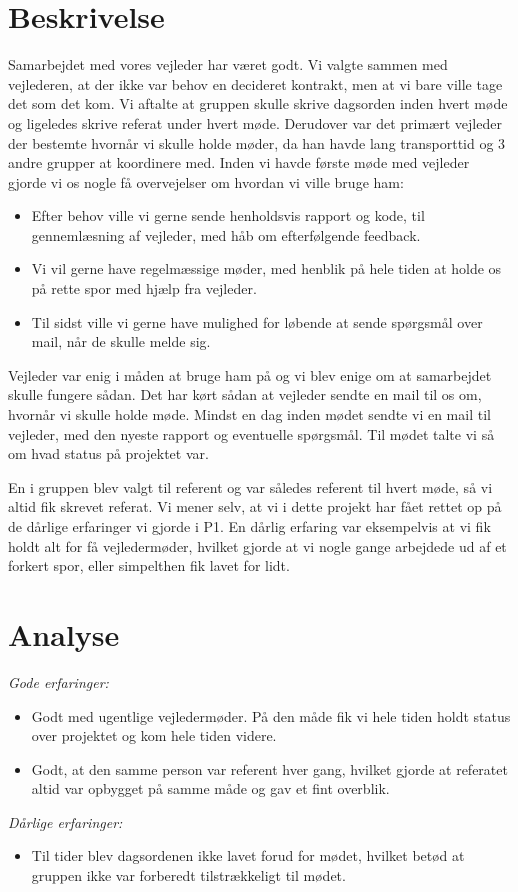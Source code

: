 \section{Beskrivelse}
Samarbejdet med vores vejleder har været godt. Vi valgte sammen med vejlederen, at der ikke var behov en decideret kontrakt, men at vi bare ville tage det som det kom. Vi aftalte at gruppen skulle skrive dagsorden inden hvert møde og ligeledes skrive referat under hvert møde. Derudover var det primært vejleder der bestemte hvornår vi skulle holde møder, da han havde lang transporttid og 3 andre grupper at koordinere med. Inden vi havde første møde med vejleder gjorde vi os nogle få overvejelser om hvordan vi ville bruge ham:
\begin{itemize}
\item	Efter behov ville vi gerne sende henholdsvis rapport og kode, til gennemlæsning af vejleder, med håb om efterfølgende feedback.

\item	Vi vil gerne have regelmæssige møder, med henblik på hele tiden at holde os på rette spor med hjælp fra vejleder.

\item Til sidst ville vi gerne have mulighed for løbende at sende spørgsmål over mail, når de skulle melde sig.
\end{itemize}
Vejleder var enig i måden at bruge ham på og vi blev enige om at samarbejdet skulle fungere sådan. Det har kørt sådan at vejleder sendte en mail til os om, hvornår vi skulle holde møde. Mindst en dag inden mødet sendte vi en mail til vejleder, med den nyeste rapport og eventuelle spørgsmål. Til mødet talte vi så om hvad status på projektet var. 

En i gruppen blev valgt til referent og var således referent til hvert møde, så vi altid fik skrevet referat. Vi mener selv, at vi i dette projekt har fået rettet op på de dårlige erfaringer vi gjorde i P1. En dårlig erfaring var eksempelvis at vi fik holdt alt for få vejledermøder, hvilket gjorde at vi nogle gange arbejdede ud af et forkert spor, eller simpelthen fik lavet for lidt. 

\section{Analyse}

\emph{Gode erfaringer:}
\begin{itemize}

\item Godt med ugentlige vejledermøder. På den måde fik vi hele tiden holdt status over projektet og kom hele tiden videre.

\item Godt, at den samme person var referent hver gang, hvilket gjorde at referatet altid var opbygget på samme måde og gav et fint overblik.
\end{itemize}
\emph{Dårlige erfaringer:}
\begin{itemize}
\item	Til tider blev dagsordenen ikke lavet forud for mødet, hvilket betød at gruppen ikke var forberedt tilstrækkeligt til mødet.

\end{itemize}


